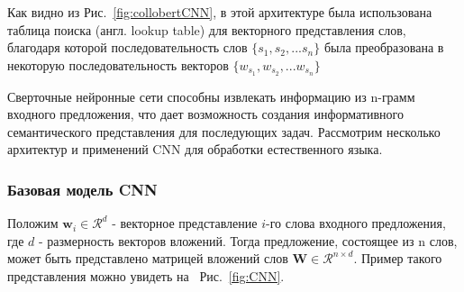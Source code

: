 Как видно из Рис.~\ref{fig:collobertCNN}, в этой архитектуре была использована таблица поиска (англ. lookup table) для векторного представления слов, благодаря которой последовательность слов $\{s_1, s_2, ... s_n\}$ была преобразована в некоторую последовательность векторов $\{ {{w}_{s_1}}, {{w}_{s_2}}, ... {{w}_{s_n}} \}$

Сверточные нейронные сети способны извлекать информацию из n-грамм входного предложения, что дает возможность создания информативного семантического представления для последующих задач. Рассмотрим несколько архитектур и применений CNN для обработки естественного языка.

\subsubsection{Базовая модель CNN}
Положим ${\mathbf w_{i}} \in \mathcal{R}^d$ - векторное представление $i$-го слова входного предложения, где $d$ - размерность векторов вложений. Тогда предложение, состоящее из n слов, может быть представлено матрицей вложений слов ${\mathbf W} \in \mathcal{R}^{n \times d}$. Пример такого представления можно увидеть на ~Рис.~\ref{fig:CNN}.

